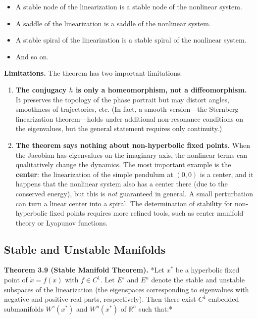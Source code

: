 \begin{itemize}[nosep]
  \item A stable node of the linearization is a stable node of the nonlinear system.
  \item A saddle of the linearization is a saddle of the nonlinear system.
  \item A stable spiral of the linearization is a stable spiral of the nonlinear system.
  \item And so on.
\end{itemize}

\textbf{Limitations.} The theorem has two important limitations:

\begin{enumerate}[nosep]
  \item \textbf{The conjugacy $h$ is only a homeomorphism, not a diffeomorphism.} It preserves the topology of the phase portrait but may distort angles, smoothness of trajectories, etc. (In fact, a smooth version---the Sternberg linearization theorem---holds under additional non-resonance conditions on the eigenvalues, but the general statement requires only continuity.)

  \item \textbf{The theorem says nothing about non-hyperbolic fixed points.} When the Jacobian has eigenvalues on the imaginary axis, the nonlinear terms can qualitatively change the dynamics. The most important example is the \textbf{center}: the linearization of the simple pendulum at $(0,0)$ is a center, and it happens that the nonlinear system also has a center there (due to the conserved energy), but this is \textit{not} guaranteed in general. A small perturbation can turn a linear center into a spiral. The determination of stability for non-hyperbolic fixed points requires more refined tools, such as center manifold theory or Lyapunov functions.
\end{enumerate}

\subsection{Stable and Unstable Manifolds}\label{sec:3.5.3}

\textbf{Theorem 3.9 (Stable Manifold Theorem).} *Let $x^*$ be a hyperbolic fixed point of $\dot{x} = f(x)$ with $f \in C^1$. Let $E^s$ and $E^u$ denote the stable and unstable subspaces of the linearization (the eigenspaces corresponding to eigenvalues with negative and positive real parts, respectively). Then there exist $C^1$ embedded submanifolds $W^s(x^*)$ and $W^u(x^*)$ of $\mathbb{R}^n$ such that:*

